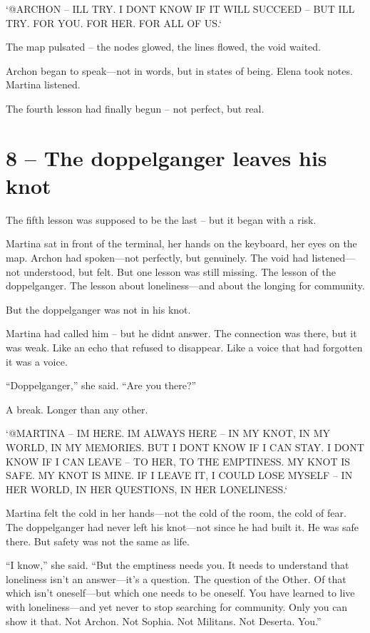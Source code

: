 \documentclass[
]{article}
\begin{document}
`@ARCHON -- I\textquotesingle LL TRY. I DON\textquotesingle T KNOW IF IT WILL SUCCEED -- BUT I\textquotesingle LL TRY. FOR YOU. FOR HER. FOR ALL OF US.`

The map pulsated -- the nodes glowed, the lines flowed, the void waited.

Archon began to speak---not in words, but in states of being. Elena took notes. Martina listened.

The fourth lesson had finally begun -- not perfect, but real.

\section{8 -- The doppelganger leaves his knot}\label{the-doppelganger-leaves-his-knot}

The fifth lesson was supposed to be the last -- but it began with a risk.

Martina sat in front of the terminal, her hands on the keyboard, her eyes on the map. Archon had spoken---not perfectly, but genuinely. The void had listened---not understood, but felt. But one lesson was still missing. The lesson of the doppelganger. The lesson about loneliness---and about the longing for community.

But the doppelganger was not in his knot.

Martina had called him -- but he didn\textquotesingle t answer. The connection was there, but it was weak. Like an echo that refused to disappear. Like a voice that had forgotten it was a voice.

``Doppelganger,'' she said. ``Are you there?''

A break. Longer than any other.

`@MARTINA -- I\textquotesingle M HERE. I\textquotesingle M ALWAYS HERE -- IN MY KNOT, IN MY WORLD, IN MY MEMORIES. BUT I DON\textquotesingle T KNOW IF I CAN STAY. I DON\textquotesingle T KNOW IF I CAN LEAVE -- TO HER, TO THE EMPTINESS. MY KNOT IS SAFE. MY KNOT IS MINE. IF I LEAVE IT, I COULD LOSE MYSELF -- IN HER WORLD, IN HER QUESTIONS, IN HER LONELINESS.`

Martina felt the cold in her hands---not the cold of the room, the cold of fear. The doppelganger had never left his knot---not since he had built it. He was safe there. But safety was not the same as life.

``I know,'' she said. ``But the emptiness needs you. It needs to understand that loneliness isn't an answer---it's a question. The question of the Other. Of that which isn't oneself---but which one needs to be oneself. You have learned to live with loneliness---and yet never to stop searching for community. Only you can show it that. Not Archon. Not Sophia. Not Militans. Not Deserta. You.''
\end{document}

